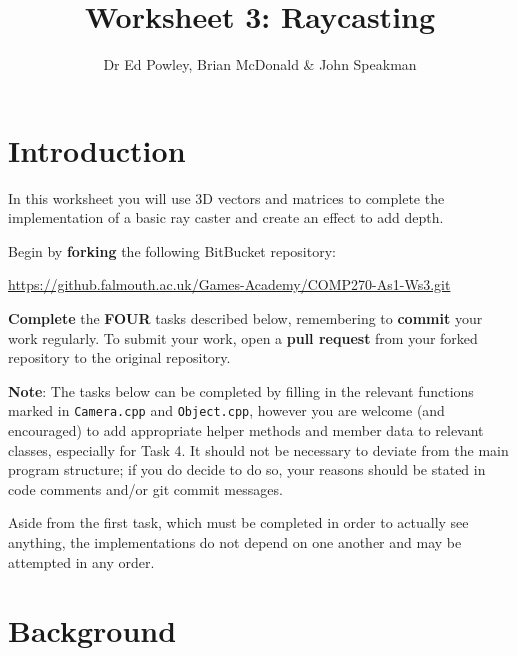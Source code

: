 \documentclass{../../../fal_assignment}
\title{Worksheet 3: Raycasting}
\author{Dr Ed Powley, Brian McDonald \& John Speakman}
\begin{document}
\maketitle

\section*{Introduction}

In this worksheet you will use 3D vectors and matrices to complete the implementation of a basic ray caster and create an effect to add depth.

Begin by \textbf{forking} the following BitBucket repository:

\begin{center}
	\url{https://github.falmouth.ac.uk/Games-Academy/COMP270-As1-Ws3.git}
\end{center}

\textbf{Complete} the \textbf{FOUR} tasks described below, remembering to \textbf{commit} your work regularly.
To submit your work, open a \textbf{pull request} from your forked repository to the original repository.

\textbf{Note}: The tasks below can be completed by filling in the relevant functions marked in \texttt{Camera.cpp} and \texttt{Object.cpp}, however you are welcome (and encouraged) to add appropriate helper methods and member data to relevant classes, especially for Task 4. It should not be necessary to deviate from the main program structure; if you do decide to do so, your reasons should be stated in code comments and/or git commit messages.

Aside from the first task, which must be completed in order to actually see anything, the implementations do not depend on one another and may be attempted in any order.

\section*{Background}
\end{document}
